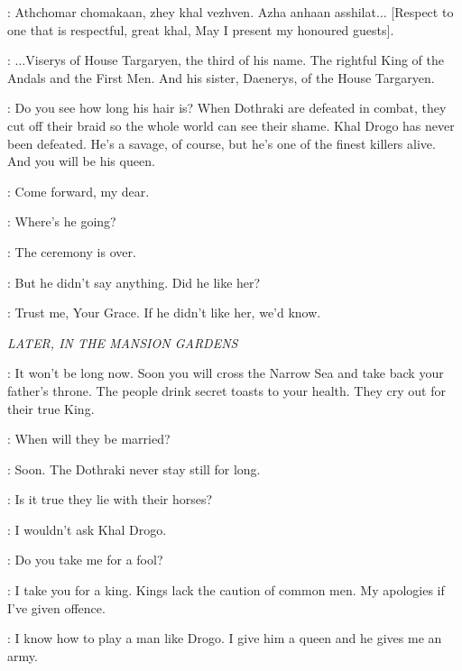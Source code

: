 
\ILLYRIO: Athchomar chomakaan, zhey khal vezhven. Azha anhaan asshilat$\ldots$ [Respect to one that is respectful, great khal, May I present my honoured guests]. 

\ILLYRIO: $\ldots$Viserys of House Targaryen, the third of his name. The rightful King of the Andals and the First Men. And his sister, Daenerys, of the House Targaryen. 

\VISERYS: Do you see how long his hair is? When Dothraki are defeated in combat, they cut off their braid so the whole world can see their shame. Khal Drogo has never been defeated. He's a savage, of course, but he's one of the finest killers alive. And you will be his queen. 

\ILLYRIO: Come forward, my dear. 


\VISERYS: Where's he going? 

\ILLYRIO: The ceremony is over. 

\VISERYS: But he didn't say anything. Did he like her? 

\ILLYRIO: Trust me, Your Grace. If he didn't like her, we'd know. 


\scene

\textit{LATER, IN THE MANSION GARDENS} 


\ILLYRIO: It won't be long now. Soon you will cross the Narrow Sea and take back your father's throne. The people drink secret toasts to your health. They cry out for their true King. 

\VISERYS: When will they be married? 

\ILLYRIO: Soon. The Dothraki never stay still for long. 

\VISERYS: Is it true they lie with their horses? 

\ILLYRIO: I wouldn't ask Khal Drogo. 

\VISERYS: Do you take me for a fool? 

\ILLYRIO: I take you for a king. Kings lack the caution of common men. My apologies if I've given offence. 

\VISERYS: I know how to play a man like Drogo. I give him a queen and he gives me an army. 

